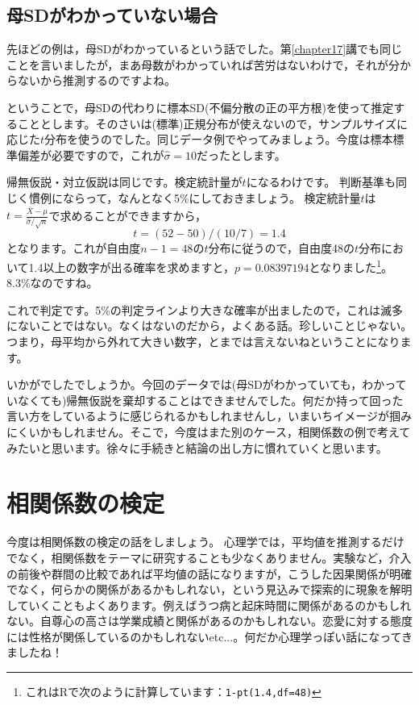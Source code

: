 \documentclass{ltjsarticle}
\begin{document}
\subsection{母SDがわかっていない場合}
先ほどの例は，母SDがわかっているという話でした。第\ref{chapter17}講でも同じことを言いましたが，まあ母数がわかっていれば苦労はないわけで，それが分からないから推測するのですよね。

ということで，母SDの代わりに標本SD(不偏分散の正の平方根)を使って推定することとします。そのさいは(標準)正規分布が使えないので，サンプルサイズに応じた$t$分布を使うのでした。同じデータ例でやってみましょう。今度は標本標準偏差が必要ですので，これが$\hat{\sigma}=10$だったとします。

帰無仮説・対立仮説は同じです。検定統計量が$t$になるわけです。
判断基準も同じく慣例にならって，なんとなく5\%にしておきましょう。
検定統計量$t$は$t = \frac{\bar{X}-\mu}{\hat{\sigma}/\sqrt{n}}$で求めることができますから，
\[ t = (52-50)/(10/7) = 1.4 \]
となります。これが自由度$n-1=48$の$t$分布に従うので，自由度48の$t$分布において1.4以上の数字が出る確率を求めますと，$p=0.08397194$となりました\footnote{これはRで次のように計算しています：\texttt{1-pt(1.4,df=48)}}。8.3\%なのですね。

これで判定です。5\%の判定ラインより大きな確率が出ましたので，これは滅多にないことではない。なくはないのだから，よくある話。珍しいことじゃない。つまり，母平均から外れて大きい数字，とまでは言えないねということになります。

いかがでしたでしょうか。今回のデータでは(母SDがわかっていても，わかっていなくても)帰無仮説を棄却することはできませんでした。何だか持って回った言い方をしているように感じられるかもしれませんし，いまいちイメージが掴みにくいかもしれません。そこで，今度はまた別のケース，相関係数の例で考えてみたいと思います。徐々に手続きと結論の出し方に慣れていくと思います。

\section{相関係数の検定}
今度は相関係数の検定の話をしましょう。
心理学では，平均値を推測するだけでなく，相関係数をテーマに研究することも少なくありません。実験など，介入の前後や群間の比較であれば平均値の話になりますが，こうした因果関係が明確でなく，何らかの関係があるかもしれない，という見込みで探索的に現象を解明していくこともよくあります。例えばうつ病と起床時間に関係があるのかもしれない。自尊心の高さは学業成績と関係があるのかもしれない。恋愛に対する態度には性格が関係しているのかもしれないetc...。何だか心理学っぽい話になってきましたね！
\end{document}
